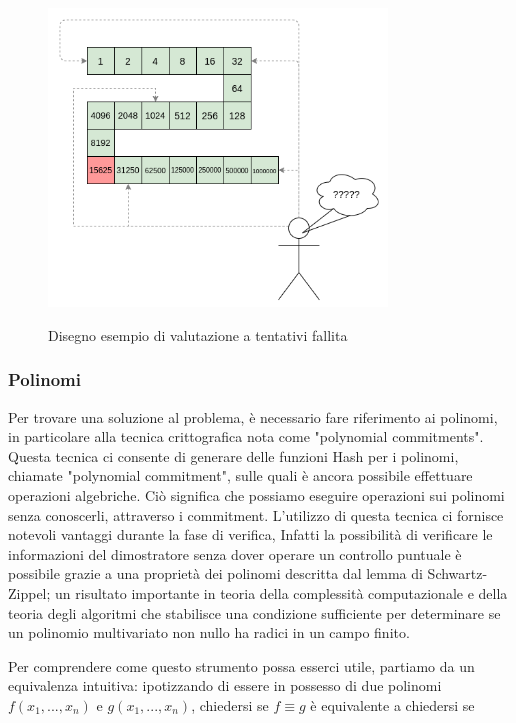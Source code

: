 \begin{figure}[H]
    \centering
    \includegraphics[width=9cm]{./chapters/1.state-of-art/images/6.hope_evaluation.png}
    \label{fig:hope-evaluation}
    \captionsetup{justification=centering}
    \caption{Disegno esempio di valutazione a tentativi fallita}
\end{figure}

\subsubsection{Polinomi}

Per trovare una soluzione al problema, è necessario fare riferimento ai polinomi, in particolare alla tecnica
crittografica nota come "polynomial commitments". Questa tecnica ci consente di generare delle funzioni Hash per i
polinomi, chiamate "polynomial commitment", sulle quali è ancora possibile effettuare operazioni algebriche. Ciò
significa che possiamo eseguire operazioni sui polinomi senza conoscerli, attraverso i commitment. L'utilizzo di questa
tecnica ci fornisce notevoli vantaggi durante la fase di verifica, Infatti la possibilità di verificare le informazioni
del dimostratore senza dover operare un controllo puntuale è possibile grazie a una proprietà dei polinomi descritta dal
lemma di Schwartz-Zippel; un risultato importante in teoria della complessità
computazionale e della teoria degli algoritmi che stabilisce una condizione sufficiente per determinare se un polinomio
multivariato non nullo ha radici in un campo finito.

Per comprendere come questo strumento possa esserci utile, partiamo da un equivalenza intuitiva: ipotizzando di essere
in possesso di due polinomi $f(x_1,...,x_n)$ e $g(x_1,...,x_n)$, chiedersi se $f \equiv g$ è
equivalente a chiedersi se 

